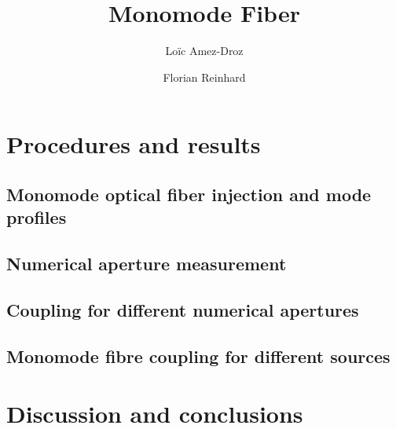 \documentclass[a4paper, 12pt]{paper}
\author{Loïc Amez-Droz \and Florian Reinhard}
\title{Monomode Fiber}
\begin{document}

\section{Procedures and results}
\subsection{Monomode optical fiber injection and mode profiles}
\lipsum[1]
\subsection{Numerical aperture measurement}
\lipsum[2]
\subsection{Coupling for different numerical apertures}
\lipsum[3]
\subsection{Monomode fibre coupling for different sources}

\section{Discussion and conclusions}
\lipsum[6]
\end{document}
